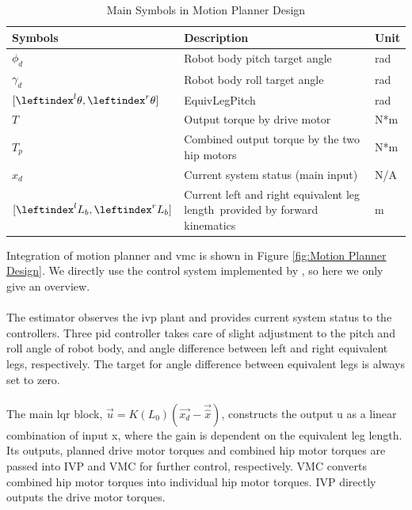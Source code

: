 \documentclass[12pt]{article}
\begin{document}
            \begin{table}[H]
                \centering
                \begin{tabular}{|p{}|p{}|p{}|}            
                    \hline Symbols   & Description & Unit        \\
                    \hline $\phi_d$ & Robot body pitch target angle & rad \\            
                    \hline $\gamma_d$ & Robot body roll target angle & rad \\
                    \hline $[\leftindex^l {\theta},\leftindex^r {\theta}]$ & EquivLegPitch & rad \\
                    \hline $ T     $ & Output torque by drive motor & N*m         \\
                    \hline $ T_p   $ & Combined output torque by the two hip motors & N*m         \\
                    \hline $x_d$ & Current system status (main input) & N/A \\
                    \hline $[\leftindex^l {L}_b,\leftindex^r {L}_b]$ & Current left and right equivalent leg length\, provided by forward kinematics & m \\            
                    \hline
                \end{tabular}
                \caption{Main Symbols in Motion Planner Design} \label{tbl:Main Symbols in Motion Planner Design}
            \end{table}

            Integration of motion planner and \acrshort{vmc} is shown in Figure \ref{fig:Motion Planner Design}. We directly use the control system implemented by \citet{HarbinEngCtrlDesign2022}, so here we only give an overview.\\\\
            The estimator observes the \acrshort{ivp} plant and provides current system status to the controllers. Three \acrshort{pid} controller takes care of slight adjustment to the pitch and roll angle of robot body, and angle difference between left and right equivalent legs, respectively. The target for angle difference between equivalent legs is always set to zero.\\\\
            The main \acrshort{lqr} block, $\vec{u}=K(L_0)(\vec{x_d}-\vec{\hat{x}})$, constructs the output u as a linear combination of input x, where the gain is dependent on the equivalent leg length. Its outputs, planned drive motor torques and combined hip motor torques are passed into IVP and VMC for further control, respectively. VMC converts combined hip motor torques into individual hip motor torques. IVP directly outputs the drive motor torques.
\end{document}
